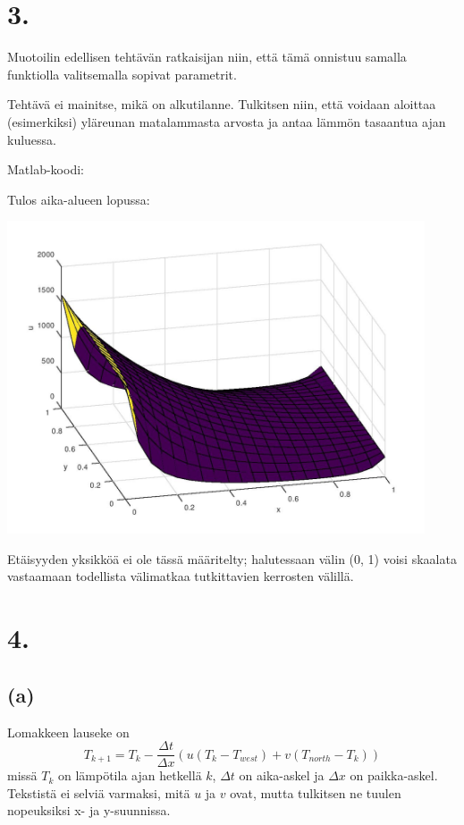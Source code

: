 \documentclass{article}
\begin{document}
\newpage

\section*{3.}

Muotoilin edellisen tehtävän ratkaisijan niin, että tämä onnistuu
samalla funktiolla valitsemalla sopivat parametrit.

Tehtävä ei mainitse, mikä on alkutilanne. Tulkitsen niin, että voidaan aloittaa
(esimerkiksi) yläreunan matalammasta arvosta ja antaa lämmön tasaantua ajan kuluessa.

Matlab-koodi:



Tulos aika-alueen lopussa:

\includegraphics[width=350pt]{w4_3.jpg}

Etäisyyden yksikköä ei ole tässä määritelty; halutessaan välin (0, 1) voisi skaalata
vastaamaan todellista välimatkaa tutkittavien kerrosten välillä.

\newpage

\section*{4.}

\subsection*{(a)}

Lomakkeen lauseke on
\[
  T_{k+1} = T_k - \frac{\Delta t}{\Delta x} (u(T_k - T_{west}) + v(T_{north} - T_k))
\]
missä $T_{k}$ on lämpötila ajan hetkellä $k$, $\Delta t$ on aika-askel ja
$\Delta x$ on paikka-askel. Tekstistä ei selviä varmaksi, mitä $u$ ja $v$
ovat, mutta tulkitsen ne tuulen nopeuksiksi x- ja y-suunnissa.
\end{document}
